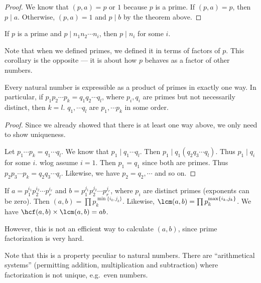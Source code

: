 \documentclass[a4paper]{article}
\begin{document}
\begin{proof}
  We know that $(p, a) = p$ or $1$ because $p$ is a prime. If $(p, a) = p$, then $p \mid a$. Otherwise, $(p, a) = 1$ and $p \mid b$ by the theorem above.
\end{proof}

\begin{cor}
  If $p$ is a prime and $p\mid n_1n_2\cdots n_i$, then $p \mid n_i$ for some $i$.
\end{cor}
Note that when we defined primes, we defined it in terms of factors of $p$. This corollary is the opposite --- it is about how $p$ behaves as a factor of other numbers.

\begin{thm}
  Every natural number is expressible as a product of primes in exactly one way. In particular, if $p_1p_2\cdots p_k = q_1q_2\cdots q_l$, where $p_i, q_i$ are primes but not necessarily distinct, then $k = l$. $q_1, \cdots q_l$ are $p_1, \cdots p_k$ in some order.
\end{thm}

\begin{proof}
  Since we already showed that there is at least one way above, we only need to show uniqueness.

  Let $p_1\cdots p_k = q_1\cdots q_l$. We know that $p_1 \mid q_1\cdots q_l$. Then $p_1 \mid q_1(q_2q_3\cdots q_l)$. Thus $p_1 \mid q_i$ for some $i$. wlog assume $i = 1$. Then $p_1 = q_1$ since both are primes. Thus $p_2p_3 \cdots p_k = q_2q_3\cdots q_l$. Likewise, we have $p_2 = q_2, \cdots$ and so on.
\end{proof}

\begin{cor}
  If $a = p_1^{i_1}p_2^{i_2}\cdots p_r^{i_r}$ and $b = p_1^{j_1}p_2^{j_2}\cdots p_r^{j_r}$, where $p_i$ are distinct primes (exponents can be zero). Then $(a, b)=\prod p_k^{\min\{i_k, j_k\}}$. Likewise, $\lcm(a, b) = \prod p_k^{\max\{i_k, j_k\}}$. We have $\hcf(a, b)\times\lcm(a, b) = ab$.
\end{cor}
However, this is not an efficient way to calculate $(a, b)$, since prime factorization is very hard.

Note that this is a property peculiar to natural numbers. There are ``arithmetical systems'' (permitting addition, multiplication and subtraction) where factorization is not unique, e.g.\ even numbers.
\end{document}
